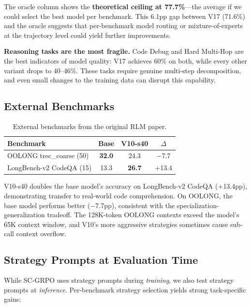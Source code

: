 \documentclass{article}
\begin{document}
The oracle column shows the \textbf{theoretical ceiling at 77.7\%}---the average if we could select the best model per benchmark. This 6.1pp gap between V17 (71.6\%) and the oracle suggests that per-benchmark model routing or mixture-of-experts at the trajectory level could yield further improvements.

\textbf{Reasoning tasks are the most fragile.} Code Debug and Hard Multi-Hop are the best indicators of model quality: V17 achieves 60\% on both, while every other variant drops to 40--46\%. These tasks require genuine multi-step decomposition, and even small changes to the training data can disrupt this capability.

\subsection{External Benchmarks}
\label{sec:external}

\begin{table}[t]
\caption{External benchmarks from the original RLM paper.}
\label{tab:external}
\vskip 0.15in
\begin{center}
\begin{small}
\begin{tabular}{lccc}
\toprule
Benchmark & Base & V10-s40 & $\Delta$ \\
\midrule
OOLONG trec\_coarse (50) & \textbf{32.0} & 24.3 & $-7.7$ \\
LongBench-v2 CodeQA (15) & 13.3 & \textbf{26.7} & +13.4 \\
\bottomrule
\end{tabular}
\end{small}
\end{center}
\vskip -0.15in
\end{table}

V10-s40 doubles the base model's accuracy on LongBench-v2 CodeQA ($+$13.4pp), demonstrating transfer to real-world code comprehension. On OOLONG, the base model performs better ($-$7.7pp), consistent with the specialization-generalization tradeoff. The 128K-token OOLONG contexts exceed the model's 65K context window, and V10's more aggressive strategies sometimes cause sub-call context overflow.

\subsection{Strategy Prompts at Evaluation Time}
\label{sec:strategy-eval}

While SC-GRPO uses strategy prompts during \emph{training}, we also test strategy prompts at \emph{inference}. Per-benchmark strategy selection yields strong task-specific gains:
\end{document}
